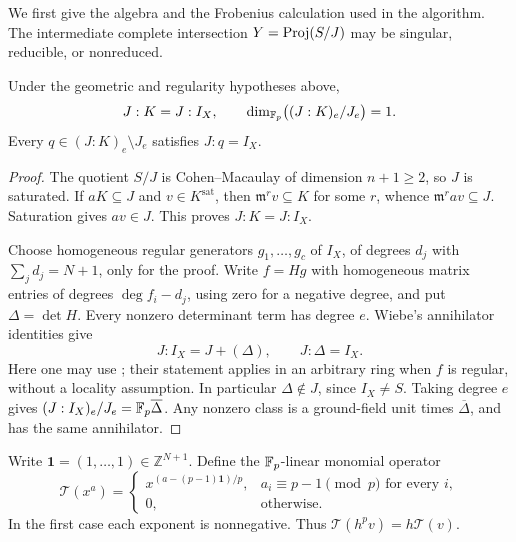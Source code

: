 We first give the algebra and the Frobenius calculation used in the
algorithm. The intermediate complete intersection \(Y=\operatorname{Proj}(S/J)\)
may be singular, reducible, or nonreduced.

\begin{lemma}
\label{sci:lem:annihilator}
Under the geometric and regularity hypotheses above,
\[
 J:K=J:I_X,\qquad
 \dim_{\mathbb F_p}\bigl((J:K)_e/J_e\bigr)=1.
\]
Every \(q\in(J:K)_e\setminus J_e\) satisfies \(J:q=I_X\).
\end{lemma}
\begin{proof}
The quotient \(S/J\) is Cohen--Macaulay of dimension \(n+1\geq2\), so
\(J\) is saturated. If \(aK\subseteq J\) and \(v\in K^{\mathrm{sat}}\),
then \(\mathfrak m^r v\subseteq K\) for some \(r\), whence
\(\mathfrak m^r av\subseteq J\). Saturation gives \(av\in J\).
This proves \(J:K=J:I_X\).

Choose homogeneous regular generators \(g_1,\ldots,g_c\) of \(I_X\),
of degrees \(d_j\) with \(\sum_jd_j=N+1\), only for the proof.
Write \(f=Hg\) with homogeneous matrix entries of degrees
\(\deg f_i-d_j\), using zero for a negative degree, and put
\(\Delta=\det H\). Every nonzero determinant term has degree \(e\).
Wiebe's annihilator identities give
\[
 J:I_X=J+(\Delta),\qquad J:\Delta=I_X.
\]
Here one may use \citet[Theorem~11 and Corollary~12, \S2--3]{sci-wiebe};
their statement applies in an arbitrary ring when \(f\) is regular,
without a locality assumption. In particular \(\Delta\notin J\),
since \(I_X\ne S\). Taking degree \(e\) gives
\((J:I_X)_e/J_e=\mathbb F_p\overline{\Delta}\).
Any nonzero class is a ground-field unit times \(\overline{\Delta}\),
and has the same annihilator.
\end{proof}

Write \(\mathbf1=(1,\ldots,1)\in\mathbb Z^{N+1}\).
Define the \(\mathbb F_p\)-linear monomial operator
\[
 \mathcal T(x^a)=
 \begin{cases}
 x^{(a-(p-1)\mathbf1)/p},
       &a_i\equiv p-1\pmod p\text{ for every }i,\\
 0,&\text{otherwise}.
 \end{cases}
\]
In the first case each exponent is nonnegative. Thus
\(\mathcal T(h^p v)=h\mathcal T(v)\).

